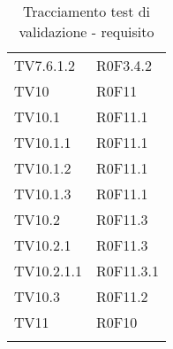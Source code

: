 \documentclass[PianoDiQualifica.tex]{subfiles}
\begin{document}
\begin{longtable}[H]{P{6.5cm}P{7cm}}
	TV7.6.1.2  & R0F3.4.2 \\ 
	TV10  & R0F11 \\ 
	TV10.1  & R0F11.1 \\ 
	TV10.1.1  & R0F11.1 \\ 
	TV10.1.2  & R0F11.1 \\ 
	TV10.1.3  & R0F11.1 \\ 
	TV10.2  & R0F11.3 \\ 
	TV10.2.1  & R0F11.3 \\ 
	TV10.2.1.1  & R0F11.3.1 \\ 
	TV10.3  & R0F11.2 \\ 
	TV11  & R0F10 \\ 
	
	\hiderowcolors
	\caption{Tracciamento test di validazione - requisito}
\end{longtable}
\end{document}
